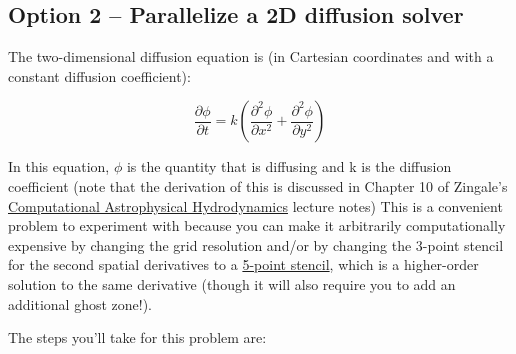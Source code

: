 \documentclass[10pt]{article}
\begin{document}
\subsection{Option 2 -- Parallelize a 2D diffusion solver}
\label{sec:parallel-option}



The two-dimensional diffusion equation is (in Cartesian coordinates
and with a constant diffusion coefficient):

\begin{equation}
\frac{\partial \phi}{\partial t} = k \left(   \frac{\partial^2 \phi}{\partial
  x^2}   +  \frac{\partial^2 \phi}{\partial y^2} \right)
\end{equation}

In this equation, $\phi$ is the quantity that is diffusing and k is
the diffusion coefficient (note that the derivation of this is
discussed in Chapter 10 of Zingale's
\href{https://open-astrophysics-bookshelf.github.io/numerical_exercises/CompHydroTutorial.pdf}{Computational
Astrophysical Hydrodynamics} lecture notes) This is a convenient
problem to experiment with because you can make it arbitrarily
computationally expensive by changing the grid resolution and/or by
changing the 3-point stencil for the second spatial derivatives to a
\href{https://en.wikipedia.org/wiki/Five-point_stencil#1D_higher-order_derivatives}{5-point
stencil}, which is a higher-order solution to the same derivative
(though it will also require you to add an additional ghost
zone!).

The steps you'll take for this problem are:
\end{document}
